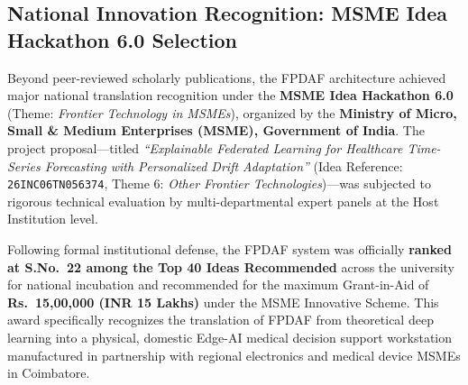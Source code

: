 \documentclass[11pt, a4paper]{article}
\begin{document}
\subsection{National Innovation Recognition: MSME Idea Hackathon 6.0 Selection}
Beyond peer-reviewed scholarly publications, the FPDAF architecture achieved major national translation recognition under the \textbf{MSME Idea Hackathon 6.0} (Theme: \textit{Frontier Technology in MSMEs}), organized by the \textbf{Ministry of Micro, Small \& Medium Enterprises (MSME), Government of India}. The project proposal---titled \textit{``Explainable Federated Learning for Healthcare Time-Series Forecasting with Personalized Drift Adaptation''} (Idea Reference: \texttt{26INC06TN056374}, Theme 6: \textit{Other Frontier Technologies})---was subjected to rigorous technical evaluation by multi-departmental expert panels at the Host Institution level. 

Following formal institutional defense, the FPDAF system was officially \textbf{ranked at S.No.~22 among the Top 40 Ideas Recommended} across the university for national incubation and recommended for the maximum Grant-in-Aid of \textbf{Rs.~15,00,000 (INR 15 Lakhs)} under the MSME Innovative Scheme. This award specifically recognizes the translation of FPDAF from theoretical deep learning into a physical, domestic Edge-AI medical decision support workstation manufactured in partnership with regional electronics and medical device MSMEs in Coimbatore.

\vspace{-0.15cm}
\nocite{*}
\renewcommand{\refname}{\large\bfseries\color{amritaMaroon}References}
\let\oldthebibliography\thebibliography
\let\endoldthebibliography\endthebibliography
\renewenvironment{thebibliography}[1]{%
  \begin{oldthebibliography}{#1}%
    \setlength{\itemsep}{0pt}%
    \setlength{\parskip}{0pt}%
    \footnotesize%
}{%
  \end{oldthebibliography}%
}


\end{document}
